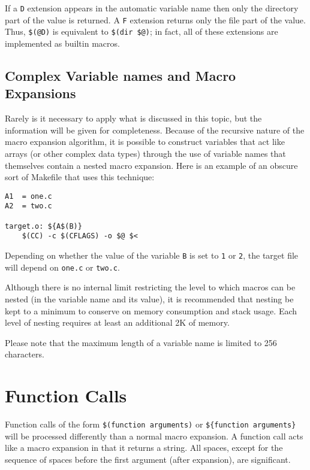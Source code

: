 If a {\tt D} extension appears in the automatic variable name then only the
directory part of the value is returned.  A {\tt F} extension returns only
the file part of the value.  Thus, \verb|$(@D)| is equivalent to
\verb|$(dir $@)|; in fact, all of these extensions are implemented as
builtin macros.


\subsection{Complex Variable names and Macro Expansions}

Rarely is it necessary to apply what is discussed in this topic, but the
information will be given for completeness.  Because of the recursive
nature of the macro expansion algorithm, it is possible to construct
variables that act like arrays (or other complex data types) through the
use of variable names that themselves contain a nested macro expansion.
Here is an example of an obscure sort of Makefile that uses this technique:

\begin{verbatim}
A1	= one.c
A2	= two.c

target.o: ${A$(B)}
    $(CC) -c $(CFLAGS) -o $@ $<
\end{verbatim}

Depending on whether the value of the variable {\tt B} is set to {\tt 1} or
{\tt 2}, the target file will depend on {\tt one.c} or {\tt two.c}.

Although there is no internal limit restricting the level to which macros
can be nested (in the variable name and its value), it is recommended that
nesting be kept to a minimum to conserve on memory consumption and stack
usage.  Each level of nesting requires at least an additional 2K of memory.

Please note that the maximum length of a variable name is limited to 256
characters.

\section{Function Calls}

Function calls of the form {\tt\$(function~arguments)} or
{\tt\$\{function~arguments\}} will be processed differently than a normal
macro expansion.  A function call acts like a macro expansion in that it
returns a string.  All spaces, except for the sequence of spaces before the
first argument (after expansion), are significant.
\newpage

